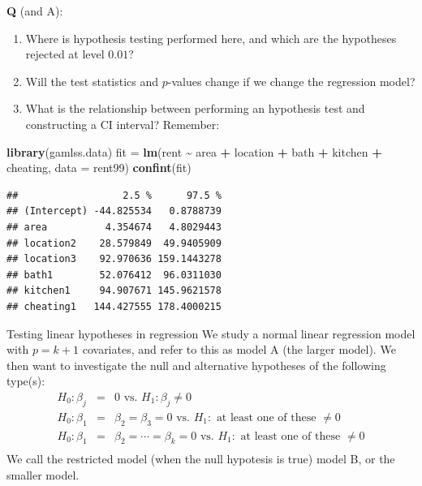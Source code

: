 \documentclass[
  ignorenonframetext,
]{beamer}
\newenvironment{Shaded}{\begin{snugshade}}{\end{snugshade}}
\newcommand{\AttributeTok}[1]{\textcolor[rgb]{0.13,0.29,0.53}{#1}}
\newcommand{\FunctionTok}[1]{\textcolor[rgb]{0.13,0.29,0.53}{\textbf{#1}}}
\newcommand{\NormalTok}[1]{#1}
\newcommand{\OtherTok}[1]{\textcolor[rgb]{0.56,0.35,0.01}{#1}}
\newcommand{\SpecialCharTok}[1]{\textcolor[rgb]{0.81,0.36,0.00}{\textbf{#1}}}
\begin{document}
\begin{frame}[fragile]
\textbf{Q} (and A):

\begin{enumerate}
\item
  Where is hypothesis testing performed here, and which are the
  hypotheses rejected at level \(0.01\)?
\item
  Will the test statistics and \(p\)-values change if we change the
  regression model?
\item
  What is the relationship between performing an hypothesis test and
  constructing a CI interval? Remember:
\end{enumerate}

\begin{Shaded}
\begin{Highlighting}[]
\FunctionTok{library}\NormalTok{(gamlss.data)}
\NormalTok{fit }\OtherTok{=} \FunctionTok{lm}\NormalTok{(rent }\SpecialCharTok{\textasciitilde{}}\NormalTok{ area }\SpecialCharTok{+}\NormalTok{ location }\SpecialCharTok{+}\NormalTok{ bath }\SpecialCharTok{+}\NormalTok{ kitchen }\SpecialCharTok{+}\NormalTok{ cheating, }\AttributeTok{data =}\NormalTok{ rent99)}
\FunctionTok{confint}\NormalTok{(fit)}
\end{Highlighting}
\end{Shaded}

\begin{verbatim}
##                  2.5 %      97.5 %
## (Intercept) -44.825534   0.8788739
## area          4.354674   4.8029443
## location2    28.579849  49.9405909
## location3    92.970636 159.1443278
## bath1        52.076412  96.0311030
## kitchen1     94.907671 145.9621578
## cheating1   144.427555 178.4000215
\end{verbatim}
\end{frame}

\begin{frame}
\begin{block}{Testing linear hypotheses in regression}
\label{testing-linear-hypotheses-in-regression}
We study a normal linear regression model with \(p=k+1\) covariates, and
refer to this as model A (the larger model). We then want to investigate
the null and alternative hypotheses of the following type(s):
\begin{eqnarray*}
 H_0: \beta_{j}&=&0 \text{ vs. } H_1:\beta_j\neq 0\\
 H_0: \beta_{1}&=&\beta_{2}=\beta_{3}=0 \text{ vs. } H_1:\text{ at least one of these }\neq 0\\
 H_0: \beta_{1}&=&\beta_{2}=\cdots=\beta_{k}=0 \text{ vs. } H_1:\text{ at least one of these }\neq 0\\
 \end{eqnarray*} We call the restricted model (when the null hypotesis
is true) model B, or the smaller model.
\end{block}
\end{frame}
\end{document}
